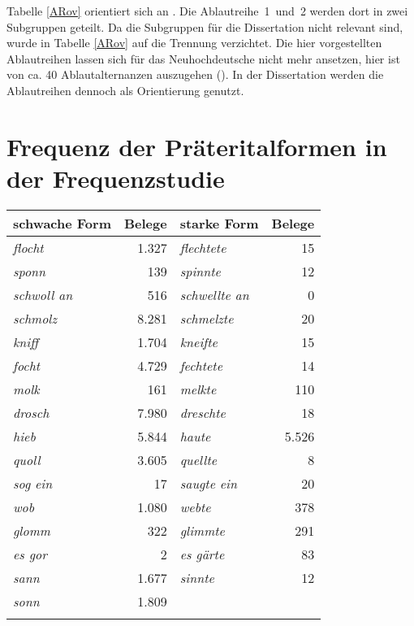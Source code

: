 \noindent Tabelle \ref{ARov} orientiert sich an \textcite[209]{Bergmann.2016}. Die Ablautreihe~1~und~2 werden dort in zwei Subgruppen geteilt. Da die Subgruppen für die Dissertation nicht relevant sind, wurde in Tabelle \ref{ARov} auf die Trennung  verzichtet. Die hier vorgestellten Ablautreihen lassen sich für das Neuhochdeutsche nicht mehr ansetzen, hier ist von ca. 40 Ablautalternanzen auszugehen (\cite[285--286]{Nubling.2017}). In der Dissertation werden die Ablautreihen dennoch als Orientierung genutzt.

\chapter{Frequenz der Präteritalformen in der Frequenzstudie}
\label{matfreqanh}

\begin{table}
\begin{tabular}{lrlr}
\lsptoprule
schwache Form & Belege & starke Form & Belege \\
\midrule
\textit{flocht} &  	1.327 & \textit{flechtete} & 15 \\
\textit{sponn}  & 139 & \textit{spinnte} & 12 \\
\textit{schwoll an} & 516 & \textit{schwellte an} & 0 \\
\textit{schmolz} & 8.281 & \textit{schmelzte} & 20\\
\textit{kniff} & 1.704 & \textit{kneifte} & 15\\
\textit{focht} & 4.729 & \textit{fechtete} & 14\\
\textit{molk} & 161 & \textit{melkte} & 110\\
\textit{drosch} & 7.980 & \textit{dreschte} & 18\\
\textit{hieb} & 5.844 & \textit{haute} & 5.526\\
\textit{quoll} & 3.605 & \textit{quellte} & 8\\
\textit{sog ein} & 17 & \textit{saugte ein} & 20\\
\textit{wob} & 1.080 & \textit{webte} & 378\\
\textit{glomm} & 322 & \textit{glimmte} & 291\\
\textit{es gor} &  2 & \textit{es gärte} & 83\\
\textit{sann} & 1.677 & \textit{sinnte} & 12 \\
\textit{sonn} & 1.809 & & \\
\lspbottomrule
\end{tabular}
\label{prätfrequ}
\end{table}

